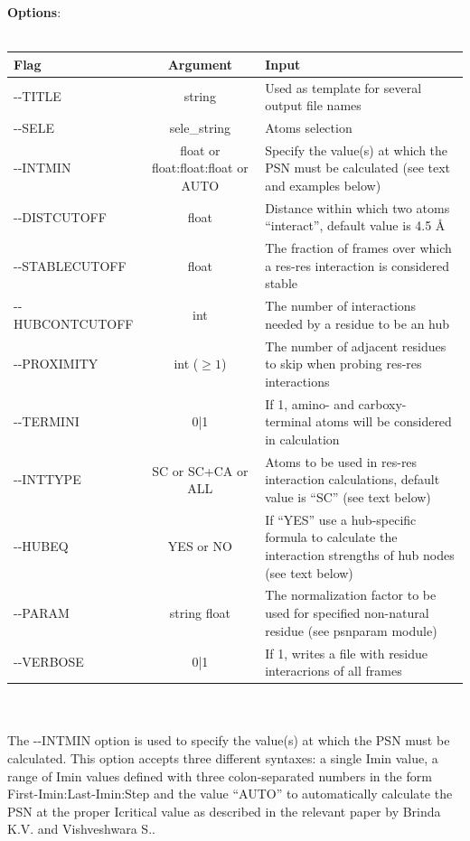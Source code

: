 \documentclass[11pt,twoside,onecolumn,a4paper,openright,notitlepage]{book}[2001/04/21]
\begin{document}
\textbf{\large Options}:\\\\
\begin{tabular}{l|c|p{7.0cm}}
Flag & Argument & Input \\
\hline
-{}-TITLE         & string                                 & Used as template for several output file names\\
-{}-SELE          & sele\_string                           & Atoms selection\\
-{}-INTMIN        & \parbox[t]{3cm}{float or float:float:float or AUTO} & Specify the value(s) at which the PSN must be calculated (see text and examples below)\\
-{}-DISTCUTOFF    & float                                  & Distance within which two atoms ``interact'', default value is 4.5 \AA{}\\
-{}-STABLECUTOFF  & float                                  & The fraction of frames over which a res-res interaction is considered stable\\
-{}-HUBCONTCUTOFF & int                                    & The number of interactions needed by a residue to be an hub\\
-{}-PROXIMITY     & int ($\ge{1}$)                         & The number of adjacent residues to skip when probing res-res interactions\\
-{}-TERMINI       & 0|1                                    & If 1, amino- and carboxy- terminal atoms will be considered in calculation\\
-{}-INTTYPE       & \parbox[t]{3cm}{SC or SC+CA or ALL}    & Atoms to be used in res-res interaction calculations, default value is ``SC'' (see text below)\\
-{}-HUBEQ         & YES or NO                              & If ``YES'' use a hub-specific formula to calculate the interaction strengths of hub nodes (see text below)\\
-{}-PARAM         & string float                           & The normalization factor to be used for specified non-natural residue (see psnparam module)\\
-{}-VERBOSE       & 0|1                                    & If 1, writes a file with residue interacrions of all frames\\
\end{tabular}\\\\

The -{}-INTMIN option is used to specify the value(s) at which the PSN must be calculated.
This option accepts three different syntaxes: a single Imin value, a range of Imin values defined with three colon-separated numbers in the form First-Imin:Last-Imin:Step and 
the value ``AUTO'' to automatically calculate the PSN at the proper Icritical value as described in the relevant paper by Brinda K.V. and Vishveshwara S.\cite{brinda05}.
\end{document}
